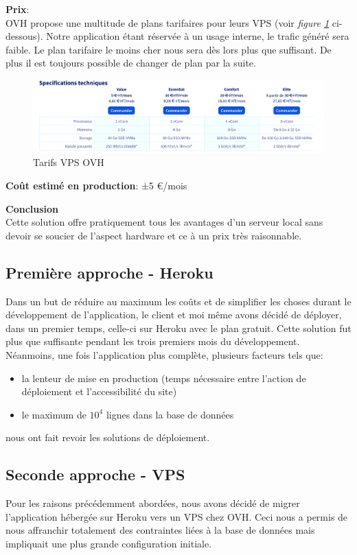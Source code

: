 \newpara
\textbf{Prix}: \\ OVH propose une multitude de plans tarifaires pour leurs VPS (voir \textit{figure \ref{ovh-pricing}} ci-dessous). Notre application étant réservée à un usage interne, le trafic généré sera faible. Le plan tarifaire le moins cher nous sera dès lors plus que suffisant. De plus il est toujours possible de changer de plan par la suite. 
\begin{figure}[H]
  \centering
  \includegraphics[width=\linewidth]{img/vps-tarifs.png}
  \caption{Tarifs VPS OVH}
  \label{ovh-pricing}
\end{figure}



\newpara
\textbf{Coût estimé en production}: ±5 €/mois

\newpara
\textbf{Conclusion} \\ Cette solution offre pratiquement tous les avantages d'un serveur local sans devoir se soucier de l'aspect hardware et ce à un prix très raisonnable. 

\newpage
\subsection{Première approche - Heroku}
Dans un but de réduire au maximum les coûts et de simplifier les choses durant le développement de l'application, le client et moi même avons décidé de déployer, dans un premier temps, celle-ci sur Heroku avec le plan gratuit. Cette solution fut plus que suffisante pendant les trois premiers mois du développement. Néanmoins, une fois l'application plus complète, plusieurs facteurs tels que: 
\begin{itemize}
  \item la lenteur de mise en production (temps nécessaire entre l'action de déploiement et l'accessibilité du site)
  \item le maximum de $10^4$ lignes dans la base de données 
\end{itemize}
nous ont fait revoir les solutions de déploiement. 

\subsection{Seconde approche - VPS}
Pour les raisons précédemment abordées, nous avons décidé de migrer l'application hébergée sur Heroku vers un VPS chez OVH. Ceci nous a permis de nous affranchir totalement des contraintes liées à la base de données mais impliquait une plus grande configuration initiale. 

